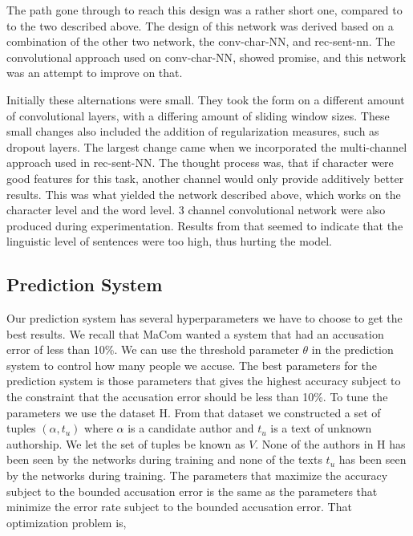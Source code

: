 The path gone through to reach this design was a rather short one, compared
to to the two described above. The design of this network was derived based
on a combination of the other two network, the \gls{conv-char-NN}, and
\gls{rec-sent-nn}. The convolutional approach used on \gls{conv-char-NN},
showed promise, and this network was an attempt to improve on that.

Initially these alternations were small. They took the form on a different
amount of convolutional layers, with a differing amount of sliding window sizes.
These small changes also included the addition of regularization measures,
such as dropout layers. The largest change came when we incorporated the
multi-channel approach used in \gls{rec-sent-NN}. The thought process was,
that if character were good features for this task, another channel would
only provide additively better results. This was what yielded the network
described above, which works on the character level and the word level. 3
channel convolutional network were also produced during experimentation. Results
from that seemed to indicate that the linguistic level of sentences were too
high, thus hurting the model.

\subsection{Prediction System}

Our prediction system has several hyperparameters we have to choose to get
the best results. We recall that MaCom wanted a system that had an accusation
error of less than 10\%. We can use the threshold parameter $\theta$ in the
prediction system to control how many people we accuse. The best parameters
for the prediction system is those parameters that gives the highest accuracy
subject to the constraint that the accusation error should be less than 10\%. To
tune the parameters we use the dataset \gls{H}. From that dataset we constructed
a set of tuples $(\alpha, t_u)$ where $\alpha$ is a candidate author and $t_u$
is a text of unknown authorship. We let the set of tuples be known as $V$. None
of the authors in \gls{H} has been seen by the networks during training and none
of the texts $t_u$ has been seen by the networks during training. The parameters
that maximize the accuracy subject to the bounded accusation error is the same
as the parameters that minimize the error rate subject to the bounded accusation
error. That optimization problem is,

